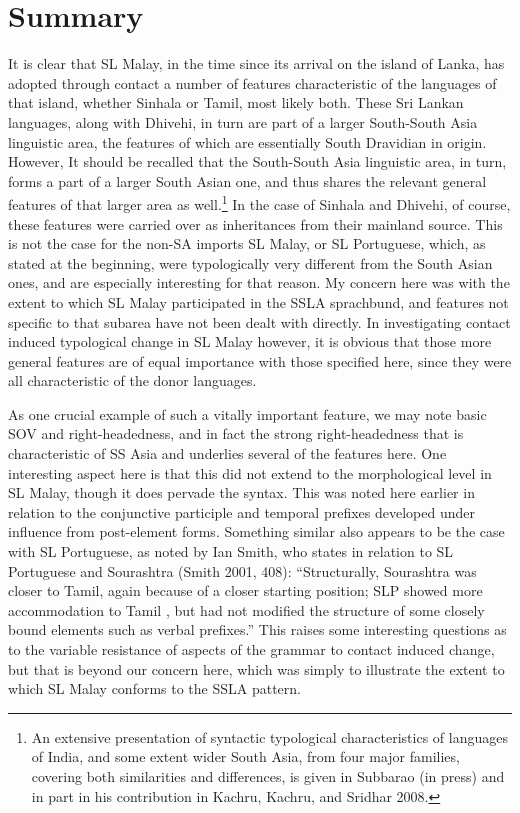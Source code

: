 \documentclass[letterpaper]{article}
\begin{document}
\section{Summary}
It is clear that SL Malay, in the time since its arrival on the island of Lanka, has adopted through contact a number of features characteristic of the languages of that island, whether Sinhala or Tamil, most likely both. These Sri Lankan languages, along with Dhivehi, in turn are part of a larger South-South Asia linguistic area, the features of which are essentially South Dravidian in origin. However, It should be recalled that the South-South Asia linguistic area, in turn, forms a part of a larger South Asian one, and thus shares the relevant general features of that larger area as well.\footnote{An
  extensive presentation of syntactic typological characteristics of languages of India, and some extent wider South Asia, from four major families, covering both similarities and differences, is given in Subbarao (in press) and in part in his contribution in Kachru, Kachru, and Sridhar 2008.
} 
In the case of Sinhala and Dhivehi, of course, these features were carried over as inheritances from their mainland source. This is not the case for the non-SA imports SL Malay, or SL Portuguese, which, as stated at the beginning, were typologically very different from the South Asian ones, and are especially interesting for that reason. My concern here was with the extent to which SL Malay participated in the SSLA sprachbund, and features not specific to that subarea have not been dealt with directly. In investigating contact induced typological change in SL Malay however, it is obvious that those more general features are of equal importance with those specified here, since they were all characteristic of the donor languages. 

 As one crucial example of such a vitally important feature, we may note basic SOV and right-headedness, and in fact the strong right-headedness that is characteristic of SS Asia and underlies several of the features here. One interesting aspect here is that this did not extend to the morphological level in SL Malay, though it does pervade the syntax. This was noted here earlier in relation to the conjunctive participle and temporal prefixes developed under influence from post-element forms. Something similar also appears to be the case with SL Portuguese, as noted by Ian Smith, who states in relation to SL Portuguese and Sourashtra (Smith  2001, 408): ``Structurally, Sourashtra was closer to Tamil, again because of a closer starting position; SLP showed more accommodation to Tamil , but had not modified the structure of some closely bound elements such as verbal prefixes.'' This raises some interesting questions as to the variable resistance of aspects of the grammar to contact induced change, but that is beyond our concern here, which was simply to illustrate the extent to which SL Malay conforms to the SSLA pattern.
\end{document}
